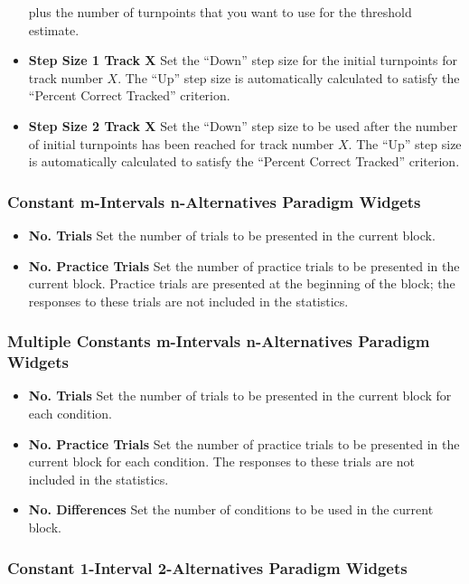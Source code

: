 \begin{itemize}
  plus the number of turnpoints that you want to use for the threshold estimate.
\item \textbf{Step Size 1 Track X} Set the ``Down'' step size for the initial turnpoints for track number $X$. The ``Up'' step size is automatically calculated to satisfy the ``Percent Correct Tracked'' criterion.
\item \textbf{Step Size 2 Track X} Set the ``Down'' step size to be used after the number of initial turnpoints has been reached for track number $X$. The ``Up'' step size is automatically calculated to satisfy the ``Percent Correct Tracked'' criterion.
\end{itemize}


\subsubsection{Constant m-Intervals n-Alternatives Paradigm Widgets}

\begin{itemize}
\item \textbf{No. Trials} Set the number of trials to be presented in the current block.
\item \textbf{No. Practice Trials} Set the number of practice trials to be presented in the current block. Practice trials are presented at the
  beginning of the block; the responses to these trials are not included in the statistics.
\end{itemize}

\subsubsection{Multiple Constants m-Intervals n-Alternatives Paradigm Widgets}

\begin{itemize}
\item \textbf{No. Trials} Set the number of trials to be presented in the current block for each condition.
\item \textbf{No. Practice Trials} Set the number of practice trials to be presented in the current block for each condition. The responses to these trials are not included in the statistics.
\item \textbf{No. Differences} Set the number of conditions to be used in the current block.
\end{itemize}

\subsubsection{Constant 1-Interval 2-Alternatives Paradigm Widgets}

